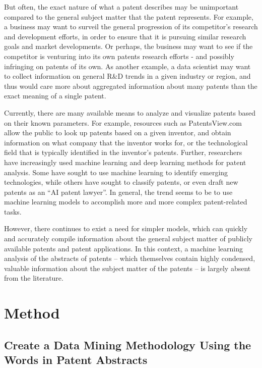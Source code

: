 \documentclass{article}
\begin{document}
But often, the exact nature of what a patent describes may be unimportant compared to the general subject matter that the patent represents. For example, a business may want to surveil the general progression of its competitor’s research and development efforts, in order to ensure that it is pursuing similar research goals and market developments. Or perhaps, the business may want to see if the competitor is venturing into its own patents research efforts - and possibly infringing on patents of its own. As another example, a data scientist may want to collect information on general R\&D trends in a given industry or region, and thus would care more about aggregated information about many patents than the exact meaning of a single patent.

Currently, there are many available means to analyze and visualize patents based on their known parameters.  For example, resources such as PatentsView.com allow the public to look up patents based on a given inventor, and obtain information on what company that the inventor works for, or the technological field that is typically identified in the inventor’s patents.  Further, researchers have increasingly used machine learning and deep learning methods for patent analysis.  Some have sought to use machine learning to identify emerging technologies\cite{website:nbsd}, while others have sought to classify patents\cite{website:nbsd2}, or even draft new patents as an “AI patent lawyer”\cite{website:nbsd3}.  In general, the trend seems to be to use machine learning models to accomplish more and more complex patent-related tasks.

However, there continues to exist a need for simpler models, which can quickly and accurately compile information about the general subject matter of publicly available patents and patent applications.  In this context, a machine learning analysis of the abstracts of patents – which themselves contain highly condensed, valuable information about the subject matter of the patents – is largely absent from the literature.
\label{background}


\section{Method}
\label{method}

\subsection{Create a Data Mining Methodology Using the Words in Patent Abstracts}
\end{document}
